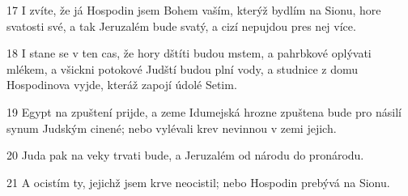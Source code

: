 \par 17 I zvíte, že já Hospodin jsem Bohem vaším, kterýž bydlím na Sionu, hore svatosti své, a tak Jeruzalém bude svatý, a cizí nepujdou pres nej více.
\par 18 I stane se v ten cas, že hory dštíti budou mstem, a pahrbkové oplývati mlékem, a všickni potokové Judští budou plní vody, a studnice z domu Hospodinova vyjde, kteráž zapojí údolé Setim.
\par 19 Egypt na zpuštení prijde, a zeme Idumejská hrozne zpuštena bude pro násilí synum Judským cinené; nebo vylévali krev nevinnou v zemi jejich.
\par 20 Juda pak na veky trvati bude, a Jeruzalém od národu do pronárodu.
\par 21 A ocistím ty, jejichž jsem krve neocistil; nebo Hospodin prebývá na Sionu.

